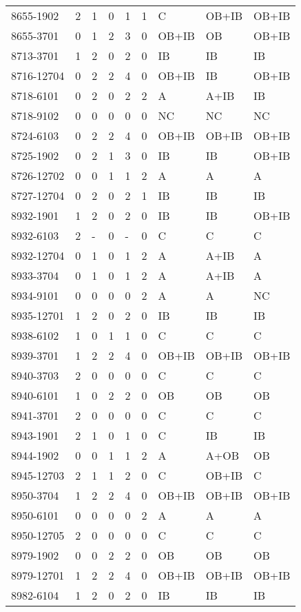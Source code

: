 \begin{longtable}{p{2.1cm}p{0.8cm}p{0.8cm}p{0.8cm}p{0.8cm}p{0.8cm}p{1.5cm}p{1.5cm}p{1.2cm}}
8655-1902 & 2 & 1 & 0 & 1 & 1 & C & OB+IB & OB+IB \\
8655-3701 & 0 & 1 & 2 & 3 & 0 & OB+IB & OB & OB+IB \\
8713-3701 & 1 & 2 & 0 & 2 & 0 & IB & IB & IB \\
8716-12704 & 0 & 2 & 2 & 4 & 0 & OB+IB & IB & OB+IB \\
8718-6101 & 0 & 2 & 0 & 2 & 2 & A & A+IB & IB \\
8718-9102 & 0 & 0 & 0 & 0 & 0 & NC & NC & NC \\
8724-6103 & 0 & 2 & 2 & 4 & 0 & OB+IB & OB+IB & OB+IB \\
8725-1902 & 0 & 2 & 1 & 3 & 0 & IB & IB & OB+IB \\
8726-12702 & 0 & 0 & 1 & 1 & 2 & A & A & A \\
8727-12704 & 0 & 2 & 0 & 2 & 1 & IB & IB & IB \\
8932-1901 & 1 & 2 & 0 & 2 & 0 & IB & IB & OB+IB \\
8932-6103 & 2 & - & 0 & - & 0 & C & C & C \\
8932-12704 & 0 & 1 & 0 & 1 & 2 & A & A+IB & A \\
8933-3704 & 0 & 1 & 0 & 1 & 2 & A & A+IB & A \\
8934-9101 & 0 & 0 & 0 & 0 & 2 & A & A & NC \\
8935-12701 & 1 & 2 & 0 & 2 & 0 & IB & IB & IB \\
8938-6102 & 1 & 0 & 1 & 1 & 0 & C & C & C \\
8939-3701 & 1 & 2 & 2 & 4 & 0 & OB+IB & OB+IB & OB+IB \\
8940-3703 & 2 & 0 & 0 & 0 & 0 & C & C & C \\
8940-6101 & 1 & 0 & 2 & 2 & 0 & OB & OB & OB \\
8941-3701 & 2 & 0 & 0 & 0 & 0 & C & C & C \\
8943-1901 & 2 & 1 & 0 & 1 & 0 & C & IB & IB \\
8944-1902 & 0 & 0 & 1 & 1 & 2 & A & A+OB & OB \\
8945-12703 & 2 & 1 & 1 & 2 & 0 & C & OB+IB & C \\
8950-3704 & 1 & 2 & 2 & 4 & 0 & OB+IB & OB+IB & OB+IB \\
8950-6101 & 0 & 0 & 0 & 0 & 2 & A & A & A \\
8950-12705 & 2 & 0 & 0 & 0 & 0 & C & C & C \\
8979-1902 & 0 & 0 & 2 & 2 & 0 & OB & OB & OB \\
8979-12701 & 1 & 2 & 2 & 4 & 0 & OB+IB & OB+IB & OB+IB \\
8982-6104 & 1 & 2 & 0 & 2 & 0 & IB & IB & IB \\

\end{longtable}
